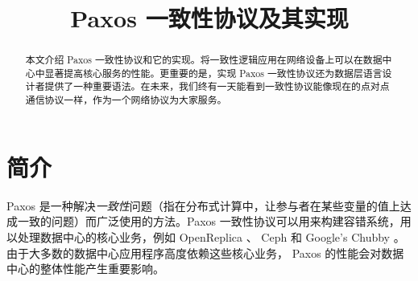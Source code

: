 \documentclass[conference]{IEEEtran}
\begin{document}
\title{Paxos 一致性协议及其实现
}

\author{
}


\maketitle

\begin{abstract}
本文介绍 Paxos 一致性协议和它的实现。将一致性逻辑应用在网络设备上可以在数据中心中显著提高核心服务的性能。更重要的是，实现 Paxos 一致性协议还为数据层语言设计者提供了一种重要语法。在未来，我们终有一天能看到一致性协议能像现在的点对点通信协议一样，作为一个网络协议为大家服务。
\end{abstract}


\section{简介}

Paxos \cite{b13} 是一种解决\emph{一致性}问题（指在分布式计算中，让参与者在某些变量的值上达成一致的问题）而广泛使用的方法。Paxos 一致性协议可以用来构建容错系统，用以处理数据中心的核心业务，例如 OpenReplica \cite{b20} 、 Ceph \cite{b5} 和 Google's Chubby \cite{b4} 。由于大多数的数据中心应用程序高度依赖这些核心业务， Paxos 的性能会对数据中心的整体性能产生重要影响。
\end{document}
